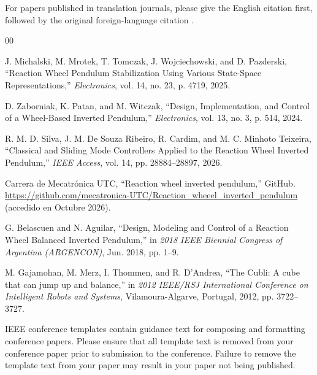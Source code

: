 \documentclass[conference]{IEEEtran}
\begin{document}
For papers published in translation journals, please give the English 
citation first, followed by the original foreign-language citation \cite{b6}.

\begin{thebibliography}{00}

 J. Michalski, M. Mrotek, T. Tomczak, J. Wojciechowski, and D. Pazderski, ``Reaction Wheel Pendulum Stabilization Using Various State-Space Representations,'' \textit{Electronics}, vol. 14, no. 23, p. 4719, 2025.

 D. Zaborniak, K. Patan, and M. Witczak, ``Design, Implementation, and Control of a Wheel-Based Inverted Pendulum,'' \textit{Electronics}, vol. 13, no. 3, p. 514, 2024.

 R. M. D. Silva, J. M. De Souza Ribeiro, R. Cardim, and M. C. Minhoto Teixeira, ``Classical and Sliding Mode Controllers Applied to the Reaction Wheel Inverted Pendulum,'' \textit{IEEE Access}, vol. 14, pp. 28884--28897, 2026.

 Carrera de Mecatrónica UTC, ``Reaction wheel inverted pendulum,'' GitHub. \url{https://github.com/mecatronica-UTC/Reaction_wheeel_inverted_pendulum} (accedido en Octubre 2026).

 G. Belascuen and N. Aguilar, ``Design, Modeling and Control of a Reaction Wheel Balanced Inverted Pendulum,'' in \textit{2018 IEEE Biennial Congress of Argentina (ARGENCON)}, Jun. 2018, pp. 1--9.

 M. Gajamohan, M. Merz, I. Thommen, and R. D'Andrea, ``The Cubli: A cube that can jump up and balance,'' in \textit{2012 IEEE/RSJ International Conference on Intelligent Robots and Systems}, Vilamoura-Algarve, Portugal, 2012, pp. 3722--3727.

\end{thebibliography}
\vspace{12pt}
\color{red}
IEEE conference templates contain guidance text for composing and formatting conference papers. Please ensure that all template text is removed from your conference paper prior to submission to the conference. Failure to remove the template text from your paper may result in your paper not being published.
\end{document}
